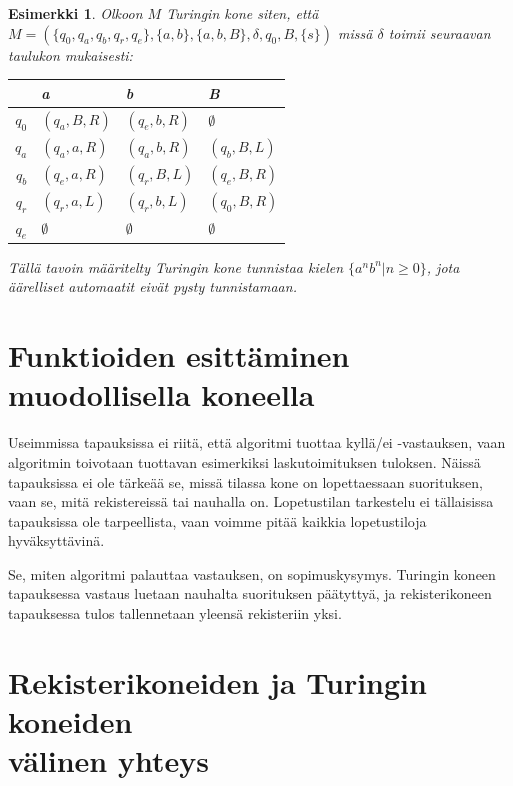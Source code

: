 \documentclass[a4paper, 12pt]{article}
\newtheorem{example}{Esimerkki}
\begin{document}
\begin{example}
Olkoon $M$ Turingin kone siten, että\\$M = (\{q_0, q_a, q_b, q_r, q_e\}, \{a, b\}, \{a, b, B\}, \delta, q_0, B, \{s\})$ missä $\delta$ toimii seuraavan taulukon mukaisesti:

\begin{tabular}{r | l l l}
& a & b & B \\
\hline
$q_0$ & $(q_a, B, R)$ & $(q_e, b, R)$ & $\emptyset$ \\
$q_a$ & $(q_a, a, R)$ & $(q_a, b, R)$ & $(q_b, B, L)$ \\
$q_b$ & $(q_e, a, R)$ & $(q_r, B, L)$ & $(q_e, B, R)$\\
$q_r$ & $(q_r, a, L)$ & $(q_r, b, L)$ & $(q_0, B, R)$\\
$q_e$ & $\emptyset$ & $\emptyset$ & $\emptyset$ \\ 
\end{tabular}

Tällä tavoin määritelty Turingin kone tunnistaa kielen $\{a^nb^n | n \geq 0\}$, jota äärelliset automaatit eivät pysty tunnistamaan.

\end{example}

\section{Funktioiden esittäminen muodollisella koneella}

Useimmissa tapauksissa ei riitä, että algoritmi tuottaa kyllä/ei -vastauksen, vaan algoritmin toivotaan tuottavan esimerkiksi laskutoimituksen tuloksen. Näissä tapauksissa ei ole tärkeää se, missä tilassa kone on lopettaessaan suorituksen, vaan se, mitä rekistereissä tai nauhalla on. Lopetustilan tarkestelu ei tällaisissa tapauksissa ole tarpeellista, vaan voimme pitää kaikkia lopetustiloja hyväksyttävinä.

Se, miten algoritmi palauttaa vastauksen, on sopimuskysymys. Turingin koneen tapauksessa vastaus luetaan nauhalta suorituksen päätyttyä, ja rekisterikoneen tapauksessa tulos tallennetaan yleensä rekisteriin yksi.

\section{Rekisterikoneiden ja Turingin koneiden\\ välinen yhteys}
\end{document}
